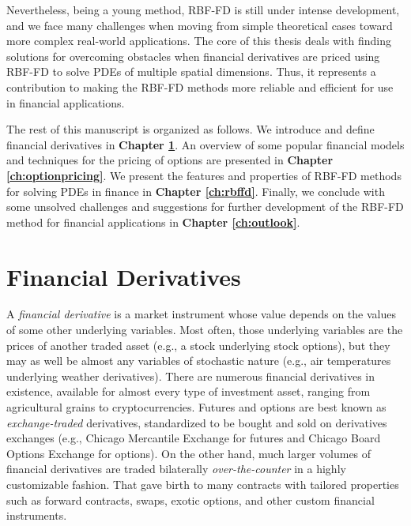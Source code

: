 \documentclass{UUThesisTemplate}
\begin{document}
\par
Nevertheless, being a young method, RBF-FD is still under intense development, and we face many challenges when moving from simple theoretical cases toward more complex real-world applications. The core of this thesis deals with finding solutions for overcoming obstacles when financial derivatives are priced using RBF-FD to solve PDEs of multiple spatial dimensions. Thus, it represents a contribution to making the RBF-FD methods more reliable and efficient for use in financial applications. 

\par
The rest of this manuscript is organized as follows. We introduce and define financial derivatives in \textbf{Chapter \ref{ch:finder}}. An overview of some popular financial models and techniques for the pricing of options are presented in \textbf{Chapter \ref{ch:optionpricing}}. We present the features and properties of RBF-FD methods for solving PDEs in finance in \textbf{Chapter \ref{ch:rbffd}}. Finally, we conclude with some unsolved challenges and suggestions for further development of the RBF-FD method for financial applications in \textbf{Chapter \ref{ch:outlook}}.
%
%





%
\chapter{Financial Derivatives}
\label{ch:finder}

\par
A \emph{financial derivative} is a market instrument whose value depends on the values of some other underlying variables. Most often, those underlying variables are the prices of another traded asset (e.g., a stock underlying stock options), but they may as well be almost any variables of stochastic nature (e.g., air temperatures underlying weather derivatives). There are numerous financial derivatives in existence, available for almost every type of investment asset, ranging from agricultural grains to cryptocurrencies. Futures and options are best known as \emph{exchange-traded} derivatives, standardized to be bought and sold on derivatives exchanges (e.g., Chicago Mercantile Exchange for futures and Chicago Board Options Exchange for options). On the other hand, much larger volumes of financial derivatives are traded bilaterally \emph{over-the-counter} in a highly customizable fashion. That gave birth to many contracts with tailored properties such as forward contracts, swaps, exotic options, and other custom financial instruments.
\end{document}
